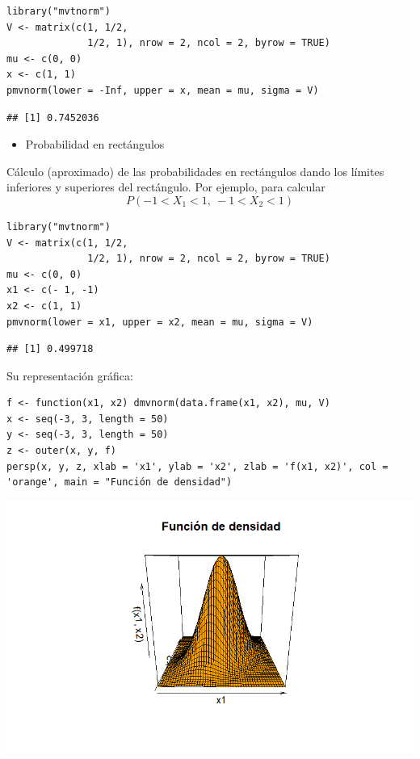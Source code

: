 
\begin{lstlisting}
library("mvtnorm")
V <- matrix(c(1, 1/2,
              1/2, 1), nrow = 2, ncol = 2, byrow = TRUE)
mu <- c(0, 0)
x <- c(1, 1)
pmvnorm(lower = -Inf, upper = x, mean = mu, sigma = V)
\end{lstlisting}

\begin{verbatim}
## [1] 0.7452036
\end{verbatim}

\begin{itemize}[label=\color{red}\textbullet, leftmargin=*]
	\item \color{lightblue}Probabilidad en rectángulos
\end{itemize}
Cálculo (aproximado) de las probabilidades en rectángulos dando los límites inferiores y superiores del rectángulo. Por ejemplo, para calcular \[ P(-1<X_1<1,\:-1<X_2<1) \]
\begin{lstlisting}
library("mvtnorm")
V <- matrix(c(1, 1/2,
              1/2, 1), nrow = 2, ncol = 2, byrow = TRUE)
mu <- c(0, 0)
x1 <- c(- 1, -1)
x2 <- c(1, 1)
pmvnorm(lower = x1, upper = x2, mean = mu, sigma = V)
\end{lstlisting}

\begin{verbatim}
## [1] 0.499718
\end{verbatim}

Su representación gráfica:

\begin{lstlisting}
f <- function(x1, x2) dmvnorm(data.frame(x1, x2), mu, V)
x <- seq(-3, 3, length = 50)
y <- seq(-3, 3, length = 50)
z <- outer(x, y, f)
persp(x, y, z, xlab = 'x1', ylab = 'x2', zlab = 'f(x1, x2)', col = 'orange', main = "Función de densidad")
\end{lstlisting}

\begin{center}
\includegraphics{"Temas/Imágenes/Tema 1/000012.png"}
\end{center}

